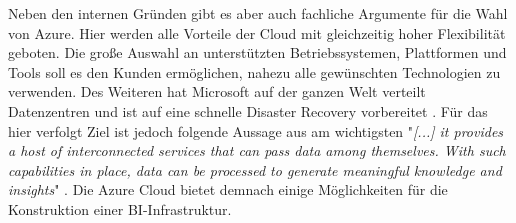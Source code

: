 Neben den internen Gründen gibt es aber auch fachliche Argumente für die Wahl von Azure. Hier werden alle Vorteile der Cloud mit gleichzeitig hoher Flexibilität geboten. Die große Auswahl an unterstützten Betriebssystemen, Plattformen und Tools soll es den Kunden ermöglichen, nahezu alle gewünschten Technologien zu verwenden. Des Weiteren hat Microsoft auf der ganzen Welt verteilt Datenzentren und ist auf eine schnelle Disaster Recovery vorbereitet \cite{modi_azure_2020}. Für das hier verfolgt Ziel ist jedoch folgende Aussage aus  am wichtigsten "\textit{[...] it provides a host of interconnected services that can pass data among themselves. With such capabilities in place, data can be processed to generate meaningful knowledge and insights}" \cite{modi_azure_2020}. Die Azure Cloud bietet demnach einige Möglichkeiten für die Konstruktion einer BI-Infrastruktur.

